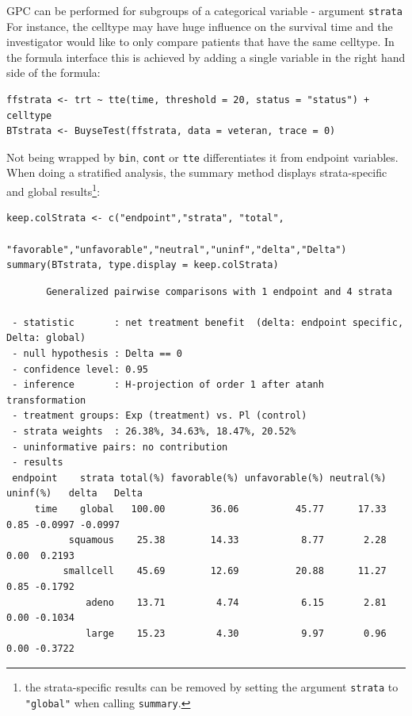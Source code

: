\documentclass[12pt]{article}
\begin{document}
GPC can be performed for subgroups of a categorical variable \hfill -
argument \texttt{strata} \newline For instance, the celltype may have huge
influence on the survival time and the investigator would like to only
compare patients that have the same celltype. In the formula interface
this is achieved by adding a single variable in the right hand side of
the formula:
\lstset{language=r,label= ,caption= ,captionpos=b,numbers=none}
\begin{lstlisting}
ffstrata <- trt ~ tte(time, threshold = 20, status = "status") + celltype
BTstrata <- BuyseTest(ffstrata, data = veteran, trace = 0)
\end{lstlisting}

Not being wrapped by \texttt{bin}, \texttt{cont} or \texttt{tte} differentiates it from
endpoint variables. When doing a stratified analysis, the summary method
displays strata-specific and global results\footnote{the strata-specific
results can be removed by setting the argument \texttt{strata} to \texttt{"global"}
when calling \texttt{summary}.}:
\lstset{language=r,label= ,caption= ,captionpos=b,numbers=none}
\begin{lstlisting}
keep.colStrata <- c("endpoint","strata", "total",
                    "favorable","unfavorable","neutral","uninf","delta","Delta")
summary(BTstrata, type.display = keep.colStrata)
\end{lstlisting}

\begin{verbatim}
       Generalized pairwise comparisons with 1 endpoint and 4 strata

 - statistic       : net treatment benefit  (delta: endpoint specific, Delta: global) 
 - null hypothesis : Delta == 0 
 - confidence level: 0.95 
 - inference       : H-projection of order 1 after atanh transformation 
 - treatment groups: Exp (treatment) vs. Pl (control) 
 - strata weights  : 26.38%, 34.63%, 18.47%, 20.52% 
 - uninformative pairs: no contribution
 - results
 endpoint    strata total(%) favorable(%) unfavorable(%) neutral(%) uninf(%)   delta   Delta
     time    global   100.00        36.06          45.77      17.33     0.85 -0.0997 -0.0997
           squamous    25.38        14.33           8.77       2.28     0.00  0.2193        
          smallcell    45.69        12.69          20.88      11.27     0.85 -0.1792        
              adeno    13.71         4.74           6.15       2.81     0.00 -0.1034        
              large    15.23         4.30           9.97       0.96     0.00 -0.3722
\end{verbatim}
\end{document}
